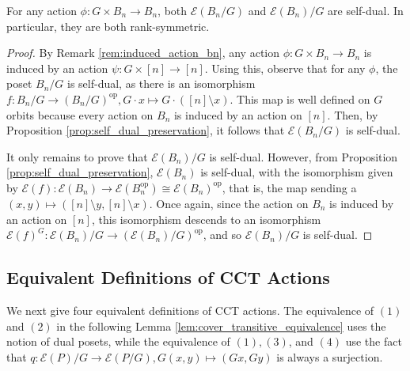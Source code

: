 \documentclass[smallextended]{svjour3}       %
\numberwithin{equation}{section}
\newcommand\ssec{\subsection}
\newcommand\op{\operatorname{op}}
\begin{document}
\begin{corollary}
\label{cor:duality_bn_quotients}
For any action $\phi\colon G \times B_n \rightarrow B_n$, both $\mathcal E(B_n/G)$ and $\mathcal E(B_n)/G$ are self-dual. In particular, they are both rank-symmetric. 
\end{corollary}
\begin{proof}
By Remark \ref{rem:induced_action_bn}, any action $\phi\colon G\times B_n \rightarrow B_n$ is induced by an action $\psi\colon G \times [n] \rightarrow [n]$. Using this, observe that for any $\phi$, the poset $B_n/G$ is self-dual, as there is an isomorphism $f\colon B_n/G \rightarrow (B_n/G)^{\op},G \cdot x \mapsto G \cdot ([n] \setminus x)$. This map is well defined on $G$ orbits because every action on $B_n$ is induced by an action on $[n]$. Then, by Proposition \ref{prop:self_dual_preservation}, it follows that $\mathcal E(B_n/G)$ is self-dual.

It only remains to prove that $\mathcal E(B_n)/G$ is self-dual. However, from Proposition \ref{prop:self_dual_preservation}, $\mathcal E(B_n)$ is self-dual, with the isomorphism given by $\mathcal E(f)\colon\mathcal E(B_n) \rightarrow \mathcal E(B_n^{\op})\cong \mathcal E(B_n)^{\op}$, that is, the map sending a $(x,y) \mapsto ([n]\setminus y,[n] \setminus x)$. Once again, since the action on $B_n$ is induced by an action on $[n]$, this isomorphism descends to an isomorphism $\mathcal E(f)^G\colon\mathcal E(B_n)/G \rightarrow  (\mathcal{E}(B_n)/G)^{\op}$, and so $\mathcal E(B_n)/G$ is self-dual.
\end{proof}

\ssec{Equivalent Definitions of CCT Actions}
\label{ssec:equivalent_defs}

We next give four equivalent definitions of CCT actions. The equivalence of $(1)$ and $(2)$ in the following Lemma \ref{lem:cover_transitive_equivalence} uses the notion of dual posets, while the equivalence of $(1),(3)$, and $(4)$ use the fact that $q\colon\mathcal E(P)/G \rightarrow \mathcal E(P/G),G(x,y)\mapsto (Gx,Gy)$ is always a surjection.
\end{document}
